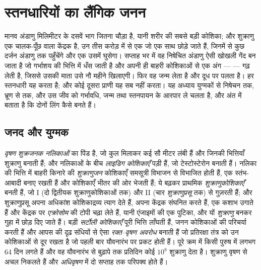 \chapter{स्तनधारियों का लैंगिक जनन}\label{ch:b2:mammal-reproduction}

मानव अंडाणु मिलिमीटर के दसवें भाग जितना चौड़ा है, यानी शरीर की सबसे बड़ी
कोशिका; और शुक्राणु एक चालक-पूँछ वाला केंद्रक है, उन तीस करोड़ में से
एक जो एक साथ छोड़े जाते हैं, जिनमें से कुछ दर्जन अंडाणु तक पहुँचेंगे और
एक उसमें घुसेगा। सप्ताह भर में वह निषेचित अंडाणु ऐसी खोखली गेंद बन जाता
है जो गर्भाशय की भित्ति में धँस जाती है और अपनी ही बाहरी कोशिकाओं से एक
अंग ---  --- गढ़ लेती है, जिससे उसकी माता उसे नौ महीने
खिलाएगी। फिर वह जन्म लेता है और दूध पर पलता है। हर स्तनधारी यह करता है;
और कोई दूसरा प्राणी यह सब नहीं करता। यह अध्याय युग्मकों से निषेचन तक,
भ्रूण से  तक, और उस जीव को गर्भावधि, जन्म तथा
स्तनपायन के आरपार ले चलता है, और अंत में बताता है कि दोनों लिंग कैसे बनते हैं।

\section{जनद और युग्मक}

\begin{definition}[वृषण और शुक्राणुजनन]\label{def:b2:mammal-reproduction:testis}
\emph{वृषण} \emph{शुक्रजनक नलिकाओं} का पिंड है, जो कुल मिलाकर कई
सौ मीटर लंबी हैं और जिनकी भित्तियाँ शुक्राणु बनाती हैं; और नलिकाओं के बीच
\emph{लाइडिग कोशिकाएँ} पड़ी हैं, जो टेस्टोस्टेरोन बनाती हैं। नलिका की
भित्ति में बाहरी किनारे की \emph{शुक्राणुजन} कोशिकाएँ समसूत्री विभाजन से
विभाजित होती हैं, एक स्तंभ-आबादी बनाए रखती हैं और कोशिकाएँ भीतर की ओर
भेजती हैं; ये बढ़कर प्राथमिक \emph{शुक्राणुकोशिकाएँ} बनती हैं, जो
 I (दो द्वितीयक शुक्राणुकोशिकाओं तक) और
 II (चार  \emph{शुक्राणुप्रसू} तक) से गुज़रती हैं;
और शुक्राणुप्रसू अपना अधिकांश कोशिकाद्रव्य त्याग देते हैं, अपना केंद्रक
संघनित करते हैं, एक कशाभ उगाते हैं और केंद्रक पर \emph{एक्रोसोम} की टोपी
चढ़ा लेते हैं, यानी एंजाइमों की एक पुटिका, और यों \emph{शुक्राणु} बनकर
गुहा में छोड़ दिए जाते हैं। बड़ी \emph{सर्टोली कोशिकाएँ} पूरी भित्ति
लाँघती हैं, जनन कोशिकाओं की परिचर्या करती हैं और आपस की दृढ़ संधियों से
ऐसा \emph{रक्त--वृषण अवरोध} बनाती हैं जो प्रतिरक्षा तंत्र को उन
कोशिकाओं से दूर रखता है जो पहली बार यौवनारंभ पर प्रकट होती हैं। पूरे
क्रम में किसी पुरुष में लगभग \num{64} दिन लगते हैं और वह यौवनारंभ से
बुढ़ापे तक प्रतिदिन कोई $10^{8}$ शुक्राणु देता है। शुक्राणु वृषण से
अचल निकलते हैं और \emph{अधिवृषण} में दो सप्ताह तक परिपक्व होते हैं।
\end{definition}

